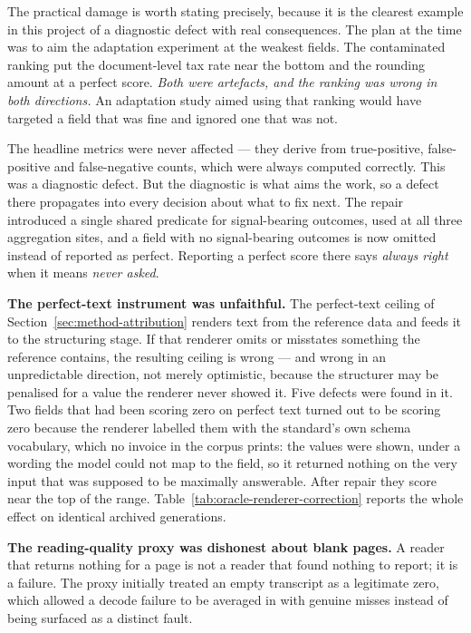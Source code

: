 The practical damage is worth stating precisely, because it is the clearest example in this
project of a diagnostic defect with real consequences. The plan at the time was to aim the
adaptation experiment at the weakest fields. The contaminated ranking put the document-level tax
rate near the bottom and the rounding amount at a perfect score. \emph{Both were artefacts,
and the ranking was wrong in both directions.} An adaptation study aimed using that ranking
would have targeted a field that was fine and ignored one that was not.

The headline metrics were never affected --- they derive from true-positive, false-positive and
false-negative counts, which were always computed correctly. This was a diagnostic defect. But
the diagnostic is what aims the work, so a defect there propagates into every decision about
what to fix next. The repair introduced a single shared predicate for signal-bearing outcomes,
used at all three aggregation sites, and a field with no signal-bearing outcomes is now omitted
instead of reported as perfect. Reporting a perfect score there says \emph{always right} when
it means \emph{never asked}.

\textbf{The perfect-text instrument was unfaithful.} The perfect-text ceiling of
Section~\ref{sec:method-attribution} renders text from the reference data and feeds it to the
structuring stage. If that renderer omits or misstates something the reference contains, the
resulting ceiling is wrong --- and wrong in an unpredictable direction, not merely
optimistic, because the structurer may be penalised for a value the renderer never showed it.
Five defects were found in it. Two fields that had been scoring zero on perfect text turned out
to be scoring zero because the renderer labelled them with the standard's own schema
vocabulary, which no invoice in the corpus prints: the values were shown, under a wording the
model could not map to the field, so it returned nothing on the very input that was supposed to
be maximally answerable. After repair they score near the top of the range.
Table~\ref{tab:oracle-renderer-correction} reports the whole effect on identical archived
generations.



\textbf{The reading-quality proxy was dishonest about blank pages.} A reader that returns
nothing for a page is not a reader that found nothing to report; it is a failure. The proxy
initially treated an empty transcript as a legitimate zero, which allowed a decode failure to
be averaged in with genuine misses instead of being surfaced as a distinct fault.

